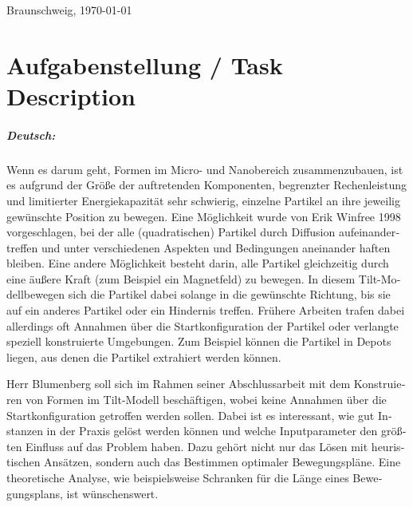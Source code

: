 \documentclass[11pt,a4paper,twoside,titlepage]{scrbook}
\theoremstyle{definition}
\begin{document}
	\par
	\bigskip\noindent Braunschweig, \today \par
	\vspace*{10mm}
	\hfill\hrulefill
	\cleardoublepage
	
	
	\chapter*{Aufgabenstellung / Task Description}


\paragraph{Deutsch:}
\begin{otherlanguage}{ngerman}
Wenn es darum geht, Formen im Micro- und Nanobereich zusammenzubauen, ist es aufgrund der Größe der auftretenden Komponenten, begrenzter Rechenleistung und limitierter Energiekapazität sehr schwierig, einzelne Partikel an ihre jeweilig gewünschte Position zu bewegen. Eine Möglichkeit wurde von Erik Winfree 1998 vorgeschlagen, bei der alle (quadratischen) Partikel durch Diffusion aufeinandertreffen und unter verschiedenen Aspekten und Bedingungen aneinander haften bleiben. Eine andere Möglichkeit besteht darin, alle Partikel gleichzeitig durch eine äußere Kraft (zum Beispiel ein Magnetfeld) zu bewegen. In diesem \glqq Tilt-Modell\grqq bewegen sich die Partikel dabei solange in die gewünschte Richtung, bis sie auf ein anderes Partikel oder ein Hindernis treffen. Frühere Arbeiten trafen dabei allerdings oft Annahmen über die Startkonfiguration der Partikel oder verlangte speziell konstruierte Umgebungen. Zum Beispiel können die Partikel in Depots liegen, aus denen die Partikel extrahiert werden können.

Herr Blumenberg soll sich im Rahmen seiner Abschlussarbeit mit dem Konstruieren von Formen im Tilt-Modell beschäftigen, wobei keine Annahmen über die Startkonfiguration getroffen werden sollen. Dabei ist es interessant, wie gut Instanzen in der Praxis gelöst werden können und welche Inputparameter den größten Einfluss auf das Problem haben. Dazu gehört nicht nur das Lösen mit heuristischen Ansätzen, sondern auch das Bestimmen optimaler Bewegungspläne. Eine theoretische Analyse, wie beispielsweise Schranken für die Länge eines Bewegungsplans, ist wünschenswert.
\end{otherlanguage}

\medskip
\end{document}
